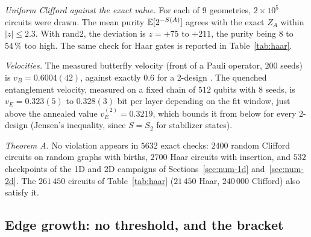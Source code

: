 \emph{Uniform Clifford against the exact value.} For each of $9$ geometries, $2\times10^5$ circuits were drawn. The mean purity $\mathbb{E}[2^{-S(A)}]$ agrees with the exact $Z_A$ within $|z|\le2.3$. With rand2, the deviation is $z=+75$ to $+211$, the purity being $8$ to $54\,\%$ too high. The same check for Haar gates is reported in Table~\ref{tab:haar}.

\emph{Velocities.} The measured butterfly velocity (front of a Pauli operator, $200$ seeds) is $v_B=0.6004(42)$, against exactly $0.6$ for a 2-design \cite{NVH2018}. The quenched entanglement velocity, measured on a fixed chain of $512$ qubits with $8$ seeds, is $v_E=0.323(5)$ to $0.328(3)$ bit per layer depending on the fit window, just above the annealed value $v_E^{(2)}=0.3219$, which bounds it from below for every 2-design (Jensen's inequality, since $S=S_2$ for stabilizer states).

\emph{Theorem A.} No violation appears in $5632$ exact checks: $2400$ random Clifford circuits on random graphs with births, $2700$ Haar circuits with insertion, and $532$ checkpoints of the 1D and 2D campaigns of Sections~\ref{sec:num-1d} and~\ref{sec:num-2d}. The $261\,450$ circuits of Table~\ref{tab:haar} ($21\,450$ Haar, $240\,000$ Clifford) also satisfy it.

\subsection{Edge growth: no threshold, and the bracket}\label{sec:num-edge}

